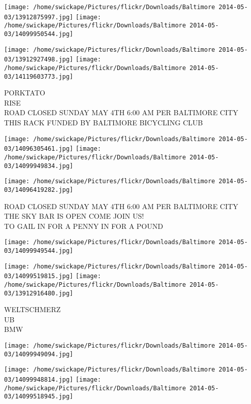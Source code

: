 \documentclass[10pt,letterpaper]{article}
\begin{document}
\texttt{[image: /home/swickape/Pictures/flickr/Downloads/Baltimore 2014-05-03/13912875997.jpg]}
\texttt{[image: /home/swickape/Pictures/flickr/Downloads/Baltimore 2014-05-03/14099950544.jpg]}

\texttt{[image: /home/swickape/Pictures/flickr/Downloads/Baltimore 2014-05-03/13912927498.jpg]}
\texttt{[image: /home/swickape/Pictures/flickr/Downloads/Baltimore 2014-05-03/14119603773.jpg]}

PORKTATO\\
RISE\\
ROAD CLOSED SUNDAY MAY 4TH 6:00 AM PER BALTIMORE CITY\\
THIS RACK FUNDED BY BALTIMORE BICYCLING CLUB
\pagebreak

\texttt{[image: /home/swickape/Pictures/flickr/Downloads/Baltimore 2014-05-03/14096305461.jpg]}
\texttt{[image: /home/swickape/Pictures/flickr/Downloads/Baltimore 2014-05-03/14099949834.jpg]}

\texttt{[image: /home/swickape/Pictures/flickr/Downloads/Baltimore 2014-05-03/14096419282.jpg]}

ROAD CLOSED SUNDAY MAY 4TH 6:00 AM PER BALTIMORE CITY\\
THE SKY BAR IS OPEN COME JOIN US!\\
TO GAIL IN FOR A PENNY IN FOR A POUND
\pagebreak

\texttt{[image: /home/swickape/Pictures/flickr/Downloads/Baltimore 2014-05-03/14099949544.jpg]}

\vspace{0.25in}
\texttt{[image: /home/swickape/Pictures/flickr/Downloads/Baltimore 2014-05-03/14099519815.jpg]}
\texttt{[image: /home/swickape/Pictures/flickr/Downloads/Baltimore 2014-05-03/13912916480.jpg]}

WELTSCHMERZ\\
UB\\
BMW
\pagebreak

\texttt{[image: /home/swickape/Pictures/flickr/Downloads/Baltimore 2014-05-03/14099949094.jpg]}

\vspace{0.25in}
\texttt{[image: /home/swickape/Pictures/flickr/Downloads/Baltimore 2014-05-03/14099948814.jpg]}
\texttt{[image: /home/swickape/Pictures/flickr/Downloads/Baltimore 2014-05-03/14099518945.jpg]}
\end{document}
